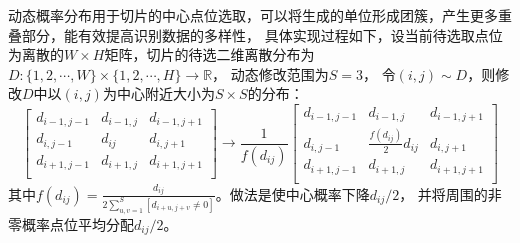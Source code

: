 

\label{app-dynamic-distrib}
动态概率分布用于切片的中心点位选取，可以将生成的单位形成团簇，产生更多重叠部分，能有效提高识别数据的多样性，
具体实现过程如下，设当前待选取点位为离散的$W\times H$矩阵，切片的待选二维离散分布为$D:\{1,2,\cdots,W\}\times \{1,2,\cdots,H\}\to \mathbb{R}$，
动态修改范围为$S=3$，
令$(i,j)\sim D$，则修改$D$中以$(i,j)$为中心附近大小为$S\times S$的分布：
\begin{equation}\label{eq-dynamic-distrib}
	\begin{bmatrix}
		d_{i-1,j-1}&d_{i-1,j}&d_{i-1,j+1}\\
		d_{i,j-1}&d_{ij}&d_{i,j+1}\\
		d_{i+1,j-1}&d_{i+1,j}&d_{i+1,j+1}\\
	\end{bmatrix}\to 
	\frac{1}{f(d_{ij})}\begin{bmatrix}
		d_{i-1,j-1}&d_{i-1,j}&d_{i-1,j+1}\\
		d_{i,j-1}&\frac{f(d_{ij})}{2}d_{ij}&d_{i,j+1}\\
		d_{i+1,j-1}&d_{i+1,j}&d_{i+1,j+1}\\
	\end{bmatrix}
\end{equation}
其中$f(d_{ij}) = \frac{d_{ij}}{2\sum_{u,v=1}^{S}[d_{i+u,j+v}\neq 0]}$。做法是使中心概率下降$d_{ij}/2$，
并将周围的非零概率点位平均分配$d_{ij}/2$。


